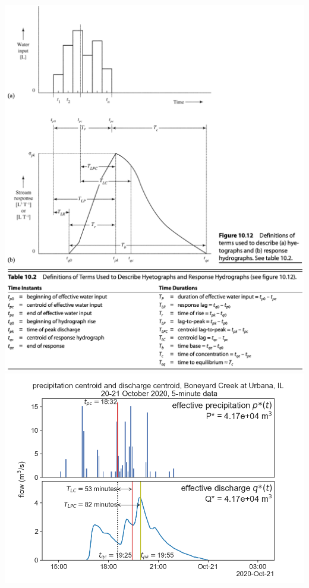 \documentclass[
  letterpaper,
  DIV=11,
  numbers=noendperiod]{scrreprt}
\begin{document}
\includegraphics{archive/figures/dingman-figure10.12.png}
\includegraphics{archive/figures/dingman-table10.2.png}
\includegraphics{archive/figures/urbana_lags.png}
\end{document}
